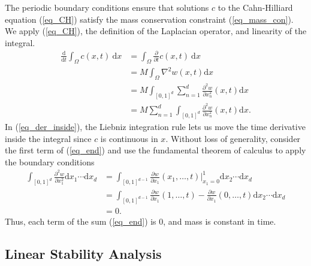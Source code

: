 \documentclass[12pt, reqno]{report}
\theoremstyle{definition}
\theoremstyle{remark}
\newcommand{\ud}{\mathrm{d}}
\begin{document}
The periodic boundary conditions ensure that solutions $c$ to the Cahn-Hilliard equation (\ref{eq_CH}) satisfy the mass conservation constraint (\ref{eq_mass_con}). 
We apply (\ref{eq_CH}), the definition of the Laplacian operator, and linearity of the integral.
\begin{align}
    \frac{\ud}{\ud t}\int_{\Omega} c(x,t)~\ud x&=\int_{\Omega} \frac{\partial}{\partial t}c(x,t)~\ud x\label{eq_der_inside}\\
    &= M\int_{\Omega}\nabla^{2}w(x,t)\ud x\\
    &= M\int_{[0,1]^{d}}\sum_{n=1}^{d}\frac{\partial ^{2}w}{\partial x_{n}^{2}}(x,t)\ud x\\
    &= M\sum_{n=1}^{d}\int_{[0,1]^{d}}\frac{\partial ^{2}w}{\partial x_{n}^{2}}(x,t)\ud x\label{eq_end}.
\end{align}
In (\ref{eq_der_inside}), the Liebniz integration rule lets us move the time derivative inside the integral since $c$ is continuous in $x$. 
Without loss of generality, consider the first term of (\ref{eq_end}) and use the fundamental theorem of calculus to apply the boundary conditions
\begin{align}
    \int_{[0,1]^{d}}\frac{\partial ^{2}w}{\partial x_{1}^{2}}\ud x_{1}\cdots \ud x_{d}&= \int_{[0,1]^{d-1}} \frac{\partial w}{\partial x_{1}}(x_{1},\dots,t)\bigg|_{x_{1}=0}^{1}\ud x_{2}\cdots \ud x_{d}\\
    &= \int_{[0,1]^{d-1}}\frac{\partial w}{\partial x_{1}}(1,\ldots,t)-\frac{\partial w}{\partial x_{1}}(0,\ldots,t)\ud x_{2}\cdots\ud x_{d}\\
    &= 0.
\end{align}
Thus, each term of the sum (\ref{eq_end}) is 0, and mass is constant in time. 


\subsection{Linear Stability Analysis}
\end{document}
